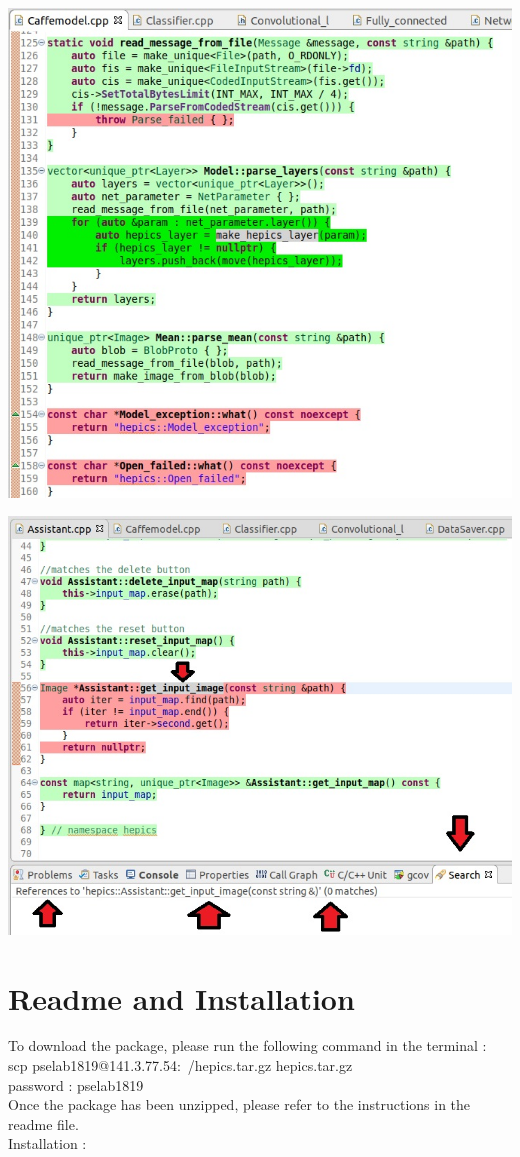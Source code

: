 \documentclass[parskip=full]{scrartcl}
\begin{document}
\includegraphics[width=1\textwidth, center]{error_code}


\includegraphics[width=1\textwidth, center]{dead_code}

\pagebreak

\section {Readme and Installation}
To download the package, please run the following command in the terminal : \\
scp pselab1819@141.3.77.54:~/hepics.tar.gz hepics.tar.gz \\
password : pselab1819 \\
Once the package has been unzipped, please refer to the instructions in the readme file.\\
Installation :
\end{document}

